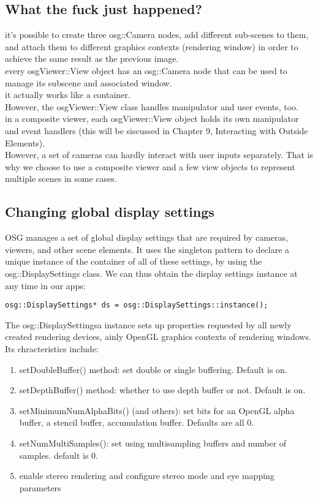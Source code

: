 \documentclass[a4paper,12pt]{book}
\begin{document}
\subsection{What the fuck just happened?}
it's possible to create three osg::Camera nodes, add different sub-scenes to them, and attach them to different graphics contexts (rendering window) in order to achieve the same result as the previous image. \\
\textrightarrow every osgViewer::View object has an osg::Camera node that can be used to manage its subscene and associated window.\\
\textrightarrow it actually works like a container.\\

However, the osgViewer::View class handles manipulator and user events, too.\\
\textrightarrow in a composite viewer, each osgViewer::View object holds its own manipulator and event handlers (this will be siscussed in Chapter 9, Interacting with Outside Elements).\\
However, a set of cameras can hardly interact with user inputs separately. That is why we choose to use a composite viewer and a few view objects to represent multiple scenes in some cases.

\subsection{Changing global display settings}
OSG manages a set of global display settings that are required by cameras, viewers, and other scene elements. It uses the singleton pattern to declare a unique instance of the container of all of these settings, by using the osg::DisplaySettings class. We can thus obtain the display settings instance at any time in our apps:
\begin{lstlisting}
osg::DisplaySettings* ds = osg::DisplaySettings::instance();
\end{lstlisting}
The osg::DisplaySettingsa instance sets up properties requested by all newly created rendering devices,  ainly OpenGL graphics contexts of rendering windows. Its chracteristics include:
\begin{enumerate}
\item setDoubleBuffer() method: set double or single buffering. Default is on.
\item setDepthBuffer() method: whether to use depth buffer or not. Default is on.
\item setMinimumNumAlphaBits() (and others): set bits for an OpenGL alpha buffer, a stencil buffer, accumulation buffer. Defaults are all 0.
\item setNumMultiSamples(): set using multisampling buffers and number of samples. default is 0.
\item enable stereo rendering and configure stereo mode and eye mapping parameters
\end{enumerate}
\end{document}
